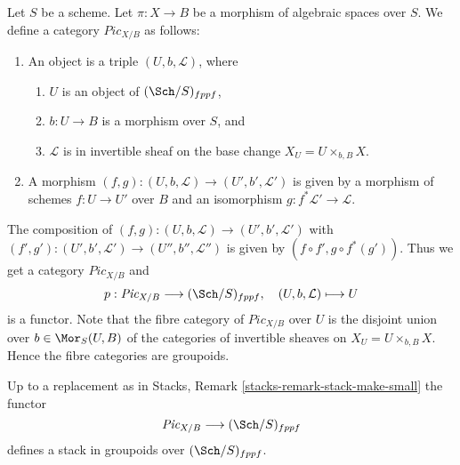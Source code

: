 \medskip\noindent
Let $S$ be a scheme.
Let $\pi : X \to B$ be a morphism of algebraic spaces over $S$.
We define a category $\textit{Pic}_{X/B}$ as follows:
\begin{enumerate}
\item An object is a triple $(U, b, \mathcal{L})$, where
\begin{enumerate}
\item $U$ is an object of $(\Sch/S)_{fppf}$,
\item $b : U \to B$ is a morphism over $S$, and
\item $\mathcal{L}$ is in invertible sheaf on the base change
$X_U = U \times_{b, B} X$.
\end{enumerate}
\item A morphism $(f, g) : (U, b, \mathcal{L}) \to (U', b', \mathcal{L}')$
is given by a morphism of schemes $f : U \to U'$ over $B$ and an
isomorphism $g : f^*\mathcal{L}' \to \mathcal{L}$.
\end{enumerate}
The composition of
$(f, g) : (U, b, \mathcal{L}) \to (U', b', \mathcal{L}')$
with
$(f', g') : (U', b', \mathcal{L}') \to (U'', b'', \mathcal{L}'')$
is given by $(f \circ f', g \circ f^*(g'))$.
Thus we get a category $\textit{Pic}_{X/B}$ and
$$
p : \textit{Pic}_{X/B} \longrightarrow (\Sch/S)_{fppf},
\quad
(U, b, \mathcal{L}) \longmapsto U
$$
is a functor. Note that the fibre category of $\textit{Pic}_{X/B}$ over $U$
is the disjoint union over $b \in \Mor_S(U, B)$ of the categories
of invertible sheaves on $X_U = U \times_{b, B} X$. Hence the fibre
categories are groupoids.

\begin{lemma}
\label{lemma-picard-stack}
Up to a replacement as in
Stacks, Remark \ref{stacks-remark-stack-make-small}
the functor
$$
\textit{Pic}_{X/B} \longrightarrow (\Sch/S)_{fppf}
$$
defines a stack in groupoids over $(\Sch/S)_{fppf}$.
\end{lemma}

